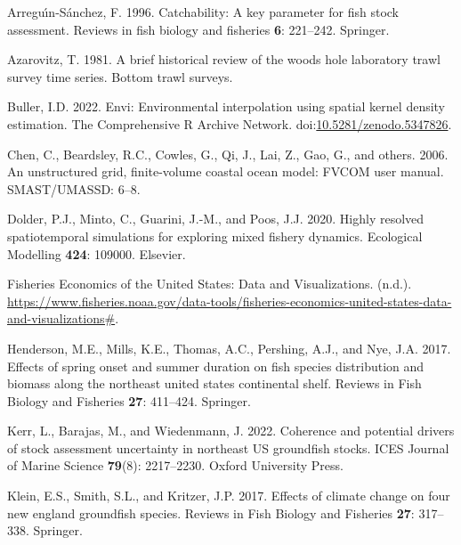 \documentclass[
  12pt,
]{article}
\newlength{\cslhangindent}
\newlength{\cslentryspacingunit} %
\newenvironment{CSLReferences}[2] %
 {%
  \setlength{\parindent}{0pt}
  \ifodd #1
  \let\oldpar\par
  \def\par{\hangindent=\cslhangindent\oldpar}
  \fi
  \setlength{\parskip}{#2\cslentryspacingunit}
 }%
 {}
\begin{document}
\hypertarget{refs}{}
\begin{CSLReferences}{1}{0}
\leavevmode{}%
Arreguı́n-Sánchez, F. 1996. Catchability: A key parameter for fish stock assessment. Reviews in fish biology and fisheries \textbf{6}: 221--242. Springer.

\leavevmode{}%
Azarovitz, T. 1981. A brief historical review of the woods hole laboratory trawl survey time series. Bottom trawl surveys.

\leavevmode{}%
Buller, I.D. 2022. Envi: Environmental interpolation using spatial kernel density estimation. The Comprehensive R Archive Network. doi:\href{https://doi.org/10.5281/zenodo.5347826}{10.5281/zenodo.5347826}.

\leavevmode{}%
Chen, C., Beardsley, R.C., Cowles, G., Qi, J., Lai, Z., Gao, G., and others. 2006. An unstructured grid, finite-volume coastal ocean model: FVCOM user manual. SMAST/UMASSD: 6--8.

\leavevmode{}%
Dolder, P.J., Minto, C., Guarini, J.-M., and Poos, J.J. 2020. Highly resolved spatiotemporal simulations for exploring mixed fishery dynamics. Ecological Modelling \textbf{424}: 109000. Elsevier.

\leavevmode{}%
{Fisheries Economics of the United States: Data and Visualizations}. (n.d.). \url{https://www.fisheries.noaa.gov/data-tools/fisheries-economics-united-states-data-and-visualizations\#}.

\leavevmode{}%
Henderson, M.E., Mills, K.E., Thomas, A.C., Pershing, A.J., and Nye, J.A. 2017. Effects of spring onset and summer duration on fish species distribution and biomass along the northeast united states continental shelf. Reviews in Fish Biology and Fisheries \textbf{27}: 411--424. Springer.

\leavevmode{}%
Kerr, L., Barajas, M., and Wiedenmann, J. 2022. Coherence and potential drivers of stock assessment uncertainty in northeast US groundfish stocks. ICES Journal of Marine Science \textbf{79}(8): 2217--2230. Oxford University Press.

\leavevmode{}%
Klein, E.S., Smith, S.L., and Kritzer, J.P. 2017. Effects of climate change on four new england groundfish species. Reviews in Fish Biology and Fisheries \textbf{27}: 317--338. Springer.


\end{CSLReferences}
\end{document}
